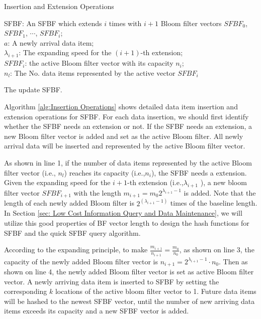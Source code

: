 \documentclass[10pt,journal,letterpaper]{IEEEtran}
\begin{document}
\begin{algorithm}[h]
\caption{Insertion and Extension Operations}
\label{alg:Insertion Operations}
\begin{algorithmic}[1]
\REQUIRE
SFBF: An SFBF which extends $i$ times with $i+1$ Bloom filter vectors $SFBF_0$, $SFBF_1$, $\cdots$, $SFBF_i$;\\
$a$: A newly arrival data item; \\
$\lambda_{i+1}$: The expanding speed for the  $(i+1)$-th extension;\\
$SFBF_i$: the active Bloom filter vector with its capacity $n_i$;\\
$n_l$: The No. data items represented by the active vector $SFBF_i$


\ENSURE
The update SFBF.\\

\ENDIF
{}
\ENDFOR
{}
\end{algorithmic}
\end{algorithm}

Algorithm \ref{alg:Insertion Operations} shows detailed data item insertion and extension  operations for SFBF. For each data insertion, we should first identify whether the SFBF needs an extension or not. If the SFBF needs an extension, a new Bloom filter vector is added and set as the active Bloom filter. All newly arrival data will be inserted and represented by the active Bloom filter vector.

As shown in line 1, if the number of data items represented by the active Bloom filter vector (i.e., $n_l$) reaches its capacity (i.e.,${n_i}$), the SFBF needs a extension. Given the expanding speed for the $i+1$-th extension (i.e.,${\lambda _{i+1}}$ ), a new bloom filter vector $SFBF_{i+1}$ with the length ${m_{i+1}} = {m_0}{2^{{\lambda_{i+1}}-1}}$ is added. Note that the length of each newly added Bloom filter is ${2^{\left( {{\lambda _{i+1}} - 1} \right)}}$ times of the baseline length. In Section \ref{sec: Low Cost Information Query and Data Maintenance}, we will utilize this  good properties of BF vector length  to design the hash functions for SFBF and the quick SFBF query algorithm.

According to the expanding principle, to make $\frac{{{m_{i + 1}}}}{{{n_{i + 1}}}} = \frac{{{m_0}}}{{{n_0}}}$,  as shown on line 3, the capacity of the newly added Bloom filter vector is ${n_{i + 1}} = {2^{{\lambda_{i+1} } - 1}} \cdot {n_0}$. Then as shown  on line 4, the newly added Bloom filter vector is set as active Bloom filter vector. A newly arriving data item is inserted to SFBF by setting the corresponding $k$ locations of the active bloom filter vector to 1. Future data items will be hashed to the newest SFBF vector, until  the number of new arriving data items exceeds its capacity and a new SFBF vector is added.
\end{document}

